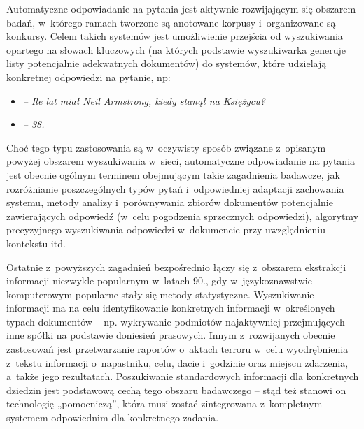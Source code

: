 \begin{multicols}{2}
Automatyczne odpowiadanie na pytania jest aktywnie rozwijającym się
obszarem badań, w~którego ramach tworzone są anotowane korpusy
i~organizowane są konkursy. Celem takich systemów jest umożliwienie
przejścia od wyszukiwania opartego na słowach kluczowych (na
których podstawie wyszukiwarka generuje listy potencjalnie
adekwatnych dokumentów) do systemów, które udzielają konkretnej
odpowiedzi na pytanie, np: 

\begin{itemize} \item[] \textit{– Ile lat miał Neil Armstrong,
kiedy stanął na Księżycu?} \item[] \textit{– 38. } \end{itemize} 

Choć tego typu zastosowania są w~oczywisty sposób związane
z~opisanym powyżej obszarem wyszukiwania w~sieci, automatyczne
odpowiadanie na pytania jest obecnie ogólnym terminem obejmującym
takie zagadnienia badawcze, jak rozróżnianie poszczególnych typów
pytań i~odpowiedniej adaptacji zachowania systemu, metody analizy
i~porównywania zbiorów dokumentów potencjalnie zawierających
odpowiedź (w~celu pogodzenia sprzecznych odpowiedzi), algorytmy
precyzyjnego wyszukiwania odpowiedzi w~dokumencie przy uwzględnieniu
kontekstu itd. 

Ostatnie z~powyższych zagadnień bezpośrednio łączy się
z~obszarem ekstrakcji informacji niezwykle popularnym w~latach 90.,
gdy w~językoznawstwie komputerowym popularne stały się metody
statystyczne. Wyszukiwanie informacji ma na celu identyfikowanie
konkretnych informacji w~określonych typach dokumentów – np.
wykrywanie podmiotów najaktywniej przejmujących inne spółki na
podstawie doniesień prasowych. Innym z~rozwijanych obecnie
zastosowań jest przetwarzanie raportów o~aktach terroru w~celu
wyodrębnienia z~tekstu informacji o~napastniku, celu, dacie
i~godzinie oraz miejscu zdarzenia, a~także jego rezultatach.
Poszukiwanie standardowych informacji dla konkretnych dziedzin jest
podstawową cechą tego obszaru badawczego – stąd też stanowi on
technologię „pomocniczą”, która musi zostać zintegrowana
z~kompletnym systemem odpowiednim dla konkretnego zadania. 



\end{multicols}
